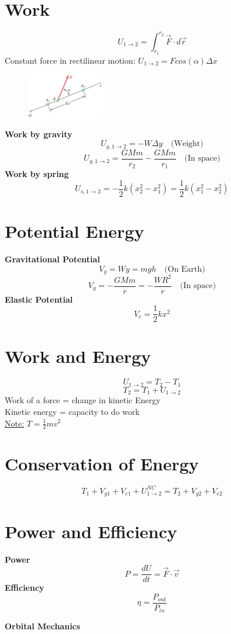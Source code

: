 \documentclass[10pt, fleqn]{article}
\begin{document}
\begin{multicols}{2}
\section*{Work}
\[U_{1\to2}=\int_{r_1}^{r_2}\vec{F}\cdot d\vec{r}\]
Constant force in rectilinear motion: $U_{1\to2}=Fcos(\alpha)\Delta x$
\begin{figure}[H]
    \includegraphics[width=0.3\textwidth]{work.png}
\end{figure}
\noindent\textbf{Work by gravity}
\[U_{g,1\to2}=-W\Delta y \quad \text{(Weight)}\]
\[U_{g,1\to2}=\frac{GMm}{r_2}-\frac{GMm}{r_1} \quad \text{(In space)}\]
\textbf{Work by spring}
\[U_{s,1\to2}=-\frac{1}{2}k(x_2^2-x_1^2)=\frac{1}{2}k(x_1^2-x_2^2)\]
\section*{Potential Energy}
\textbf{Gravitational Potential}\\
\[V_g=Wy=mgh \quad \text{(On Earth)}\]
\[V_g=-\frac{GMm}{r}=-\frac{WR^2}{r} \quad \text{(In space)}\]
\textbf{Elastic Potential}
\[V_e=\frac{1}{2}kx^2\]
\section*{Work and Energy}
\[U_{1\to2}=T_2-T_1\]
\[T_2=T_1+U_{1\to2}\]
Work of a force = change in kinetic Energy\\
Kinetic energy = capacity to do work\\
\underline{Note:} $T=\frac{1}{2}mv^2$
\section*{Conservation of Energy}
\[T_1+V_{g1}+V_{e1}+U_{1\to2}^{NC}=T_2+V_{g2}+V_{e2}\]
\section*{Power and Efficiency}
\textbf{Power}
\[P=\frac{dU}{dt}=\vec{F}\cdot\vec{v}\]
\textbf{Efficiency}
\[\eta=\frac{P_{out}}{P_{in}}\]
\end{multicols}
\newpage
\begin{center}
    \Large \textbf{Orbital Mechanics}
\end{center}
\end{document}
